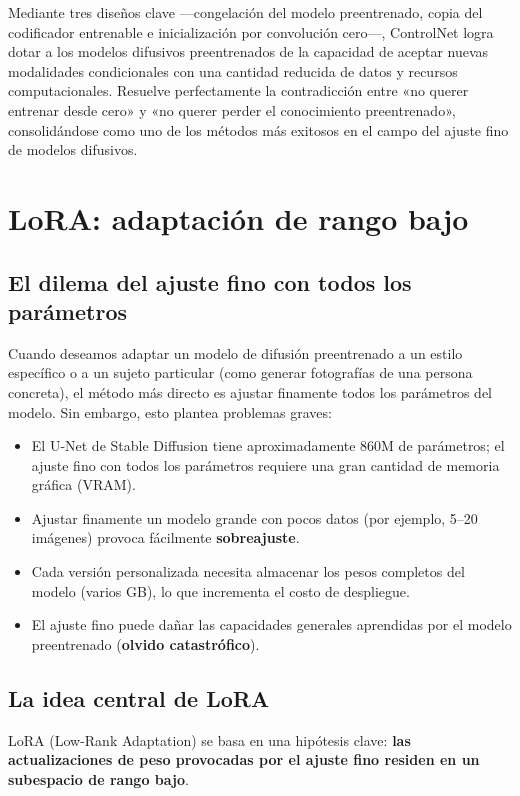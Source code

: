 \documentclass[a4paper]{article}
\begin{document}
Mediante tres diseños clave —congelación del modelo preentrenado, copia del codificador entrenable e inicialización por convolución cero—, ControlNet logra dotar a los modelos difusivos preentrenados de la capacidad de aceptar nuevas modalidades condicionales con una cantidad reducida de datos y recursos computacionales. Resuelve perfectamente la contradicción entre «no querer entrenar desde cero» y «no querer perder el conocimiento preentrenado», consolidándose como uno de los métodos más exitosos en el campo del ajuste fino de modelos difusivos.

\newpage
\section{LoRA: adaptación de rango bajo}

\subsection{El dilema del ajuste fino con todos los parámetros}

Cuando deseamos adaptar un modelo de difusión preentrenado a un estilo específico o a un sujeto particular (como generar fotografías de una persona concreta), el método más directo es ajustar finamente todos los parámetros del modelo. Sin embargo, esto plantea problemas graves:

\begin{itemize}
    \item El U-Net de Stable Diffusion tiene aproximadamente 860M de parámetros; el ajuste fino con todos los parámetros requiere una gran cantidad de memoria gráfica (VRAM).
    \item Ajustar finamente un modelo grande con pocos datos (por ejemplo, 5--20 imágenes) provoca fácilmente \textbf{sobreajuste}.
    \item Cada versión personalizada necesita almacenar los pesos completos del modelo (varios GB), lo que incrementa el costo de despliegue.
    \item El ajuste fino puede dañar las capacidades generales aprendidas por el modelo preentrenado (\textbf{olvido catastrófico}).
\end{itemize}

\subsection{La idea central de LoRA}

LoRA (Low-Rank Adaptation) se basa en una hipótesis clave: \textbf{las actualizaciones de peso provocadas por el ajuste fino residen en un subespacio de rango bajo}.
\end{document}
